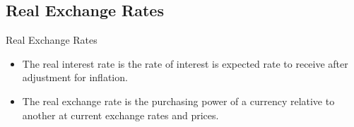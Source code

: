\documentclass[international_finance_p2.tex]{subfiles}
\begin{document}
\subsection{Real Exchange Rates}
\begin{frame}{Real Exchange Rates}
\begin{itemize}[<+->]
\item
The real interest rate is the rate of interest is expected rate to receive after adjustment for inflation.
\item
The real exchange rate is the purchasing power of a currency relative to another at current exchange rates and prices.
\end{itemize}
\end{frame}
\end{document}
